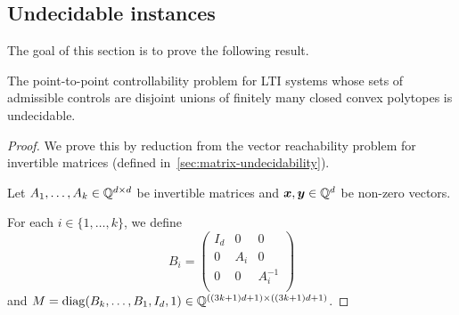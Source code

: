 \subsection{Undecidable instances}
\label{sec:lti_undecidability}

The goal of this section is to prove the following result.

\begin{theorem}
\label{thm:lti-undecidability}
The point-to-point controllability problem for LTI systems whose sets of admissible controls are disjoint unions of finitely many closed convex polytopes is undecidable.
\end{theorem}

\begin{proof}
We prove this by reduction from the vector reachability problem for invertible matrices (defined in~\cref{sec:matrix-undecidability}).

Let $A_{1}, \ldots, A_{k} \in \mathbb{Q}^{d \times d}$ be invertible matrices and $\boldsymbol{x}, \boldsymbol{y} \in \mathbb{Q}^{d}$ be non-zero vectors.

For each $i \in \lbrace 1, \ldots, k \rbrace$, we define
\begin{equation*}
B_{i} =
\begin{pmatrix}
I_{d} & 0 & 0 \\
0 & A_{i} & 0 \\
0 & 0 & A_{i}^{-1} \\
\end{pmatrix}
\end{equation*}
and $M = \operatorname{diag}(B_{k}, \ldots, B_{1}, I_{d}, 1) \in \mathbb{Q}^{((3k+1)d+1) \times ((3k+1)d+1)}$.


\end{proof}
